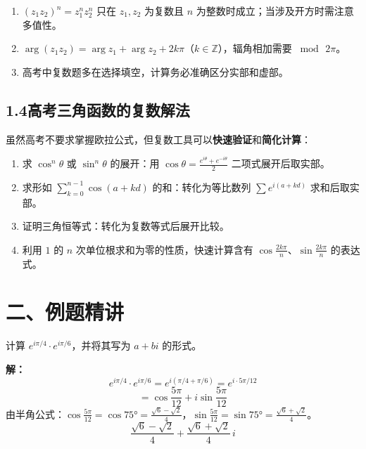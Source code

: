 \documentclass[12pt, a4paper]{ctexart}
\begin{document}
\begin{warnbox}[易错提醒]
\begin{enumerate}[label=(\arabic*)]
  \item $(z_1 z_2)^n = z_1^n z_2^n$ 只在 $z_1,z_2$ 为复数且 $n$ 为整数时成立；当涉及开方时需注意多值性。
  \item $\arg(z_1 z_2) = \arg z_1 + \arg z_2 + 2k\pi$（$k\in\mathbb{Z}$），辐角相加需要 $\bmod\,2\pi$。
  \item 高考中复数题多在选择填空，计算务必准确区分实部和虚部。
\end{enumerate}
\end{warnbox}

\subsection*{1.4\quad 高考三角函数的复数解法}

\begin{knowledgebox}[复数方法在高考中的应用策略]
虽然高考不要求掌握欧拉公式，但复数工具可以\textbf{快速验证}和\textbf{简化计算}：
\begin{enumerate}[label=(\arabic*)]
  \item 求 $\cos^n\theta$ 或 $\sin^n\theta$ 的展开：用 $\cos\theta = \frac{e^{i\theta}+e^{-i\theta}}{2}$ 二项式展开后取实部。
  \item 求形如 $\displaystyle\sum_{k=0}^{n-1}\cos(a+kd)$ 的和：转化为等比数列 $\displaystyle\sum e^{i(a+kd)}$ 求和后取实部。
  \item 证明三角恒等式：转化为复数等式后展开比较。
  \item 利用 $1$ 的 $n$ 次单位根求和为零的性质，快速计算含有 $\cos\frac{2k\pi}{n}$、$\sin\frac{2k\pi}{n}$ 的表达式。
\end{enumerate}
\end{knowledgebox}

\section*{\textcolor{examorange}{二、例题精讲}}

\begin{examplebox}[【例题1】欧拉公式基本运算]
计算 $e^{i\pi/4}\cdot e^{i\pi/6}$，并将其写为 $a+bi$ 的形式。
\end{examplebox}

\textbf{解：}
\[
  e^{i\pi/4}\cdot e^{i\pi/6} = e^{i(\pi/4+\pi/6)} = e^{i\cdot 5\pi/12}
\]
\[
  = \cos\frac{5\pi}{12}+i\sin\frac{5\pi}{12}
\]
由半角公式：$\cos\frac{5\pi}{12}=\cos 75°=\frac{\sqrt{6}-\sqrt{2}}{4}$，$\sin\frac{5\pi}{12}=\sin 75°=\frac{\sqrt{6}+\sqrt{2}}{4}$。
\[
  \boxed{\dfrac{\sqrt{6}-\sqrt{2}}{4}+\dfrac{\sqrt{6}+\sqrt{2}}{4}\,i}
\]
\end{document}
